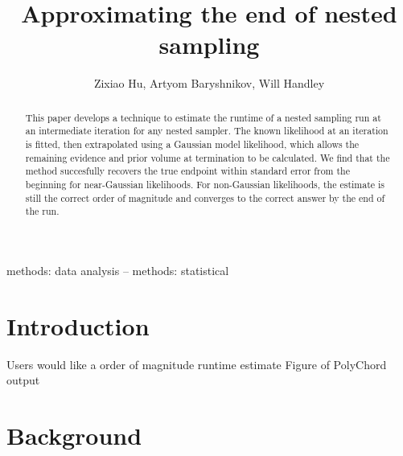 \documentclass[usenatbib]{mnras}
\title[Approximating the end of nested sampling]{Approximating the end of nested sampling}
\author[Z. Hu et. al]{Zixiao Hu, Artyom Baryshnikov, Will Handley}
\begin{document}
\label{firstpage}
\pagerange{\pageref{firstpage}--\pageref{lastpage}}
\maketitle


\begin{abstract}
This paper develops a technique to estimate the runtime of a nested sampling run at an intermediate iteration for any nested sampler. The known likelihood at an iteration is fitted, then extrapolated using a Gaussian model likelihood, which allows the remaining evidence and prior volume at termination to be calculated. We find that the method succesfully recovers the true endpoint within standard error from the beginning for near-Gaussian likelihoods. For non-Gaussian likelihoods, the estimate is still the correct order of magnitude and converges to the correct answer by the end of the run. 
\end{abstract}

\begin{keywords}
methods: data analysis -- methods: statistical
\end{keywords}

\section{Introduction}
Users would like a order of magnitude runtime estimate
Figure of PolyChord output



\section{Background}
\end{document}
